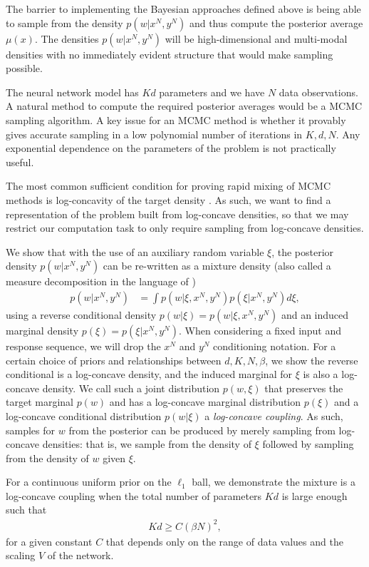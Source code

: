 \documentclass{article}
\numberwithin{equation}{section}
\theoremstyle{Lemma}
\theoremstyle{Corollary}
\theoremstyle{Theorem}
\theoremstyle{Remark}
\begin{document}
The barrier to implementing the Bayesian approaches defined above is being able to sample from the density  $p(w|x^{N}, y^{N})$ and thus compute the posterior average $\mu(x)$. The densities $p(w|x^{N}, y^{N})$ will be high-dimensional and multi-modal densities with no immediately evident structure that would make sampling possible. 

The neural network model has $Kd$ parameters and we have $N$ data observations. A natural method to compute the required posterior averages would be a MCMC sampling algorithm. A key issue for an MCMC method is whether it provably gives accurate sampling in a low polynomial number of iterations in $K,d,N$. Any exponential dependence on the parameters of the problem is not practically useful.

The most common sufficient condition for proving rapid mixing of MCMC methods is log-concavity of the target density \cite{bakry1985diffusions, bakry2014analysis, lovasz2007geometry, dwivedi2019log}. As such, we want to find a representation of the problem built from log-concave densities, so that we may restrict our computation task to only require sampling from log-concave densities.

We show that with the use of an auxiliary random variable $\xi$, the posterior density $p(w|x^{N}, y^{N})$ can be re-written as a mixture density (also called a measure decomposition in the language of \cite{montanari2024provably})
\begin{align}
p(w|x^{N}, y^{N})&= \int p(w|\xi,x^{N}, y^{N})p(\xi|x^{N}, y^{N})d\xi,
\end{align}
using a reverse conditional density $p(w|\xi) = p(w|\xi, x^{N}, y^{N})$ and an induced marginal density $p(\xi) = p(\xi|x^{N}, y^{N})$. When considering a fixed input and response sequence, we will drop the $x^{N}$ and $y^{N}$ conditioning notation. For a certain choice of priors and relationships between $d,K,N,\beta$, we show the reverse conditional is a log-concave density, and the induced marginal for $\xi$ is also a log-concave density. We call such a joint distribution $p(w, \xi)$ that preserves the target marginal $p(w)$ and has a log-concave marginal distribution $p(\xi)$ and a log-concave conditional distribution $p(w|\xi)$ a \textit{log-concave coupling}. As such, samples for $w$ from the posterior can be produced by merely sampling from log-concave densities: that is, we sample from the density of $\xi$ followed by sampling from the density of $w$ given $\xi$. 

For a continuous uniform prior on the $\ell_{1}$ ball, we demonstrate the mixture is a log-concave coupling when the total number of parameters $Kd$ is large enough such that
\begin{align}
    Kd\geq C (\beta N)^{2},
\end{align}
for a given constant $C$ that depends only on the range of data values and the scaling $V$ of the network. 
\end{document}
